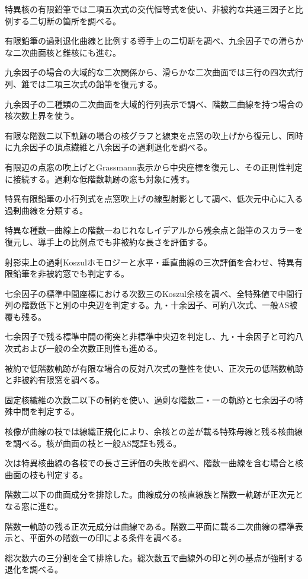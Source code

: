 \documentclass[11pt,a4paper]{ltjsarticle}
\begin{document}
特異核の有限鉛筆では二項五次式の交代恒等式を使い、非被約な共通三因子と比例する二切断の箇所を調べる。

有限鉛筆の過剰退化曲線と比例する導手上の二切断を調べ、九余因子での滑らかな二次曲面核と錐核にも進む。

九余因子の場合の大域的な二次関係から、滑らかな二次曲面では三行の四次式行列、錐では二項三次式の鉛筆を復元する。

九余因子の二種類の二次曲面を大域的行列表示で調べ、階数二曲線を持つ場合の核次数上界を使う。

有限な階数二以下軌跡の場合の核グラフと線束を点窓の吹上げから復元し、同時に九余因子の頂点繊維と八余因子の過剰退化を調べる。

有限辺の点窓の吹上げとGrassmann表示から中央座標を復元し、その正則性判定に接続する。過剰な低階数軌跡の窓も対象に残す。

特異有限鉛筆の小行列式を点窓吹上げの線型射影として調べ、低次元中心に入る過剰曲線を分類する。

特異な種数一曲線上の階数一ねじれなしイデアルから残余点と鉛筆のスカラーを復元し、導手上の比例点でも非被約な長さを評価する。

射影束上の過剰Koszulホモロジーと水平・垂直曲線の三次評価を合わせ、特異有限鉛筆を非被約窓でも判定する。

七余因子の標準中間座標における次数三のKoszul余核を調べ、全特殊値で中間行列の階数低下と別の中央辺を判定する。九・十余因子、可約八次式、一般AS被覆も残る。

七余因子で残る標準中間の衝突と非標準中央辺を判定し、九・十余因子と可約八次式および一般の全次数正則性も進める。

被約で低階数軌跡が有限な場合の反対八次式の整性を使い、正次元の低階数軌跡と非被約有限窓を調べる。

固定核繊維の次数二以下の制約を使い、過剰な階数二・一の軌跡と七余因子の特殊中間を判定する。

核像が曲線の枝では線織正規化により、余核との差が載る特殊母線と残る核曲線を調べる。核が曲面の枝と一般AS認証も残る。

次は特異核曲線の各枝での長さ三評価の失敗を調べ、階数一曲線を含む場合と核曲面の枝も判定する。

階数二以下の曲面成分を排除した。曲線成分の核直線族と階数一軌跡が正次元となる窓に進む。

階数一軌跡の残る正次元成分は曲線である。階数二平面に載る二次曲線の標準表示と、平面外の階数一の印による条件を調べる。

総次数六の三分割を全て排除した。総次数五で曲線外の印と列の基点が強制する退化を調べる。
\end{document}
